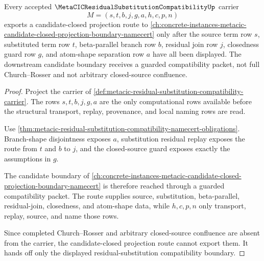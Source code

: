 \begin{theorem}
\label{thm:metacic-residual-substitution-compatibility-candidate-projection-route}
Every accepted $\MetaCICResidualSubstitutionCompatibilityUp$ carrier
$$
M=(s,t,b,j,g,a,h,c,p,n)
$$
exports a candidate-closed projection route to \autoref{ch:concrete-instances-metacic-candidate-closed-projection-boundary-namecert} only after the source term row $s$, substituted term row $t$, beta-parallel branch row $b$, residual join row $j$, closedness guard row $g$, and atom-shape separation row $a$ have all been displayed. The downstream candidate boundary receives a guarded compatibility packet, not full Church--Rosser and not arbitrary closed-source confluence.
\end{theorem}
\begin{proof}
Project the carrier of \autoref{def:metacic-residual-substitution-compatibility-carrier}. The rows $s,t,b,j,g,a$ are the only computational rows available before the structural transport, replay, provenance, and local naming rows are read.

Use \autoref{thm:metacic-residual-substitution-compatibility-namecert-obligations}. Branch-shape disjointness exposes $a$, substitution residual replay exposes the route from $t$ and $b$ to $j$, and the closed-source guard exposes exactly the assumptions in $g$.

The candidate boundary of \autoref{ch:concrete-instances-metacic-candidate-closed-projection-boundary-namecert} is therefore reached through a guarded compatibility packet. The route supplies source, substitution, beta-parallel, residual-join, closedness, and atom-shape data, while $h,c,p,n$ only transport, replay, source, and name those rows.

Since completed Church--Rosser and arbitrary closed-source confluence are absent from the carrier, the candidate-closed projection route cannot export them. It hands off only the displayed residual-substitution compatibility boundary.
\end{proof}

